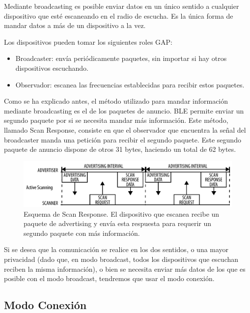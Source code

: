 Mediante broadcasting es posible enviar datos en un único sentido a cualquier dispositivo que esté escaneando en el radio de escucha. Es la única forma de mandar datos a más de un dispositivo a la vez.
 
Los dispositivos pueden tomar los siguientes roles GAP:
\begin{itemize}
	\item Broadcaster: envía periódicamente paquetes, sin importar si hay otros dispositivos escuchando.
	\item Observador: escanea las frecuencias establecidas para recibir estos paquetes. 
\end{itemize}

Como se ha explicado antes, el método utilizado para mandar información mediante broadcasting es el de los paquetes de anuncio. BLE permite enviar un segundo paquete por si se necesita mandar más información. Este método, llamado Scan Response, consiste en que el observador que encuentra la señal del broadcaster manda una petición para recibir el segundo paquete. Este segundo paquete de anuncio dispone de otros 31 bytes, haciendo un total de 62 bytes.

\begin{figure}[h]%
	\centering
    \includegraphics[width=\linewidth]{figures/ble_scan_response.png} %
    \caption[Esquema de Scan Response]{Esquema de Scan Response. El dispositivo que escanea recibe un paquete de advertising y envía esta respuesta para requerir un segundo paquete con más información.}
   	\label{figuraBLEScanResponse}
\end{figure}

Si se desea que la comunicación se realice en los dos sentidos, o una mayor privacidad (dado que, en modo broadcast, todos los dispositivos que escuchan reciben la misma información), o bien se necesita enviar más datos de los que es posible con el modo broadcast, tendremos que usar el modo conexión.

\subsection{Modo Conexión}
\label{makereference2.3.2}

